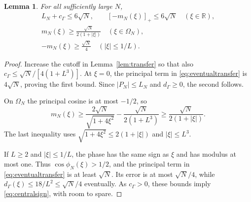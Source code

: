 \documentclass[11pt]{article}
\newtheorem{lemma}[theorem]{Lemma}
\theoremstyle{remark}
\newcommand{\R}{\mathbb R}
\numberwithin{equation}{section}
\begin{document}
\begin{lemma}\label{lem:signs}
For all sufficiently large $N$,
\begin{gather}
 L_N+c_\Gamma\le6\sqrt N,\qquad
 [-m_N(\xi)]_+\le6\sqrt N\quad(\xi\in\R),\label{eq:globalbound}\\
 m_N(\xi)\ge\frac{\sqrt N}{2(1+|\xi|)}\quad(\xi\in\Omega_N),\label{eq:bulksign}\\
 -m_N(\xi)\ge\frac{\sqrt N}{4}\quad(|\xi|\le1/L).\label{eq:centralsign}
\end{gather}
\end{lemma}
\begin{proof}
Increase the cutoff in Lemma~\ref{lem:transfer} so that also
$c_\Gamma\le\sqrt N/[4(1+L^3)]$. At $\xi=0$, the principal term in \eqref{eq:eventualtransfer} is $4\sqrt N$, proving the first bound. Since $|P_N|\le L_N$ and $d_\Gamma\ge0$, the second follows.

On $\Omega_N$ the principal cosine is at most $-1/2$, so
\[
 m_N(\xi)\ge\frac{2\sqrt N}{\sqrt{1+4\xi^2}}
                 -\frac{\sqrt N}{2(1+L^3)}
 \ge\frac{\sqrt N}{2(1+|\xi|)}.
\]
The last inequality uses $\sqrt{1+4\xi^2}\le2(1+|\xi|)$ and $|\xi|\le L^3$.

If $L\ge2$ and $|\xi|\le1/L$, the phase has the same sign as $\xi$ and has modulus at most one. Thus $\cos\phi_N(\xi)>1/2$, and the principal term in \eqref{eq:eventualtransfer} is at least $\sqrt N$. Its error is at most $\sqrt N/4$, while $d_\Gamma(\xi)\le18/L^2\le\sqrt N/4$ eventually. As $c_\Gamma>0$, these bounds imply \eqref{eq:centralsign}, with room to spare.
\end{proof}
\end{document}
